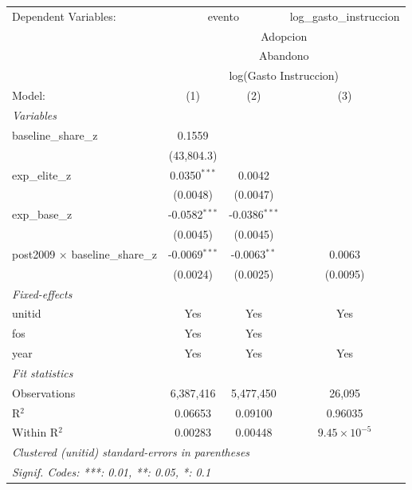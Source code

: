 
\begingroup
\centering
\begin{tabular}{lccc}
   \tabularnewline \midrule \midrule
   Dependent Variables: & \multicolumn{2}{c}{evento} & log\_gasto\_instruccion\\
    & \multicolumn{3}{c}{Adopcion} \\ 
    & \multicolumn{3}{c}{Abandono} \\ 
    & \multicolumn{3}{c}{log(Gasto Instruccion)} \\ 
   Model:                                  & (1)             & (2)             & (3)\\  
   \midrule
   \emph{Variables}\\
   baseline\_share\_z                      & 0.1559          &                 &   \\   
                                           & (43,804.3)      &                 &   \\   
   exp\_elite\_z                           & 0.0350$^{***}$  & 0.0042          &   \\   
                                           & (0.0048)        & (0.0047)        &   \\   
   exp\_base\_z                            & -0.0582$^{***}$ & -0.0386$^{***}$ &   \\   
                                           & (0.0045)        & (0.0045)        &   \\   
   post2009 $\times$ baseline\_share\_z    & -0.0069$^{***}$ & -0.0063$^{**}$  & 0.0063\\   
                                           & (0.0024)        & (0.0025)        & (0.0095)\\   
   \midrule
   \emph{Fixed-effects}\\
   unitid                                  & Yes             & Yes             & Yes\\  
   fos                                     & Yes             & Yes             & \\  
   year                                    & Yes             & Yes             & Yes\\  
   \midrule
   \emph{Fit statistics}\\
   Observations                            & 6,387,416       & 5,477,450       & 26,095\\  
   R$^2$                                   & 0.06653         & 0.09100         & 0.96035\\  
   Within R$^2$                            & 0.00283         & 0.00448         & $9.45\times 10^{-5}$\\   
   \midrule \midrule
   \multicolumn{4}{l}{\emph{Clustered (unitid) standard-errors in parentheses}}\\
   \multicolumn{4}{l}{\emph{Signif. Codes: ***: 0.01, **: 0.05, *: 0.1}}\\
\end{tabular}
\par\endgroup


